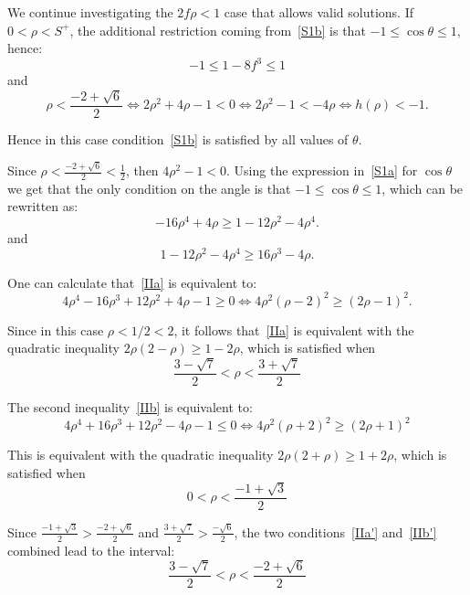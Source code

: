 \documentclass[10pt]{article}
\newcommand{\ds}{\displaystyle}
\begin{document}
\begin{description}
We continue investigating the $2 f \rho < 1$ case that allows valid solutions.
If $0<\rho<S^+$, the additional restriction coming from~\eqref{S1b} is that $-1 \leq \cos \theta \leq 1$, hence:
\[
-1 \leq 1-8f^3 \leq 1
\]
and
\[
\ds \rho < \frac{-2+\sqrt{6}}{2}
    \iff 2\rho^2+4\rho-1<0
    \iff 2\rho^2-1<-4\rho
    \iff h(\rho)<-1.
\]

Hence in this case condition~\eqref{S1b} is satisfied by all values of $\theta$.

Since $\ds \rho < \frac{-2+\sqrt{6}}{2} <\frac{1}{2}$, then $4\rho^2-1<0$. Using the expression in~\eqref{S1a} for $\cos \theta$ we get that the only condition on the angle is that $-1 \leq \cos \theta \leq 1$, which can be rewritten as:
\begin{equation}
-16\rho^4+4\rho \geq 1-12\rho^2-4\rho^4.
\tag{IIa} \label{IIa}
\end{equation}
and
\begin{equation}
1-12\rho^2-4\rho^4 \geq 16\rho^3-4\rho.
\tag{IIb} \label{IIb}
\end{equation}

One can calculate that~\eqref{IIa} is equivalent to:
\begin{equation*}
4\rho^4-16\rho^3+12\rho^2+4\rho-1 \geq 0 \iff 4\rho^2(\rho-2)^2 \geq (2\rho-1)^2.
\end{equation*}

Since in this case $\rho<1/2<2$, it follows that~\eqref{IIa} is equivalent with the quadratic inequality $2\rho(2-\rho) \geq 1-2\rho$, which is satisfied when
\begin{equation}
\frac{3-\sqrt{7}}{2} < \rho <\frac{3+\sqrt{7}}{2}
\tag{IIa$'$} \label{IIa'}
\end{equation}

The second inequality~\eqref{IIb} is equivalent to:
\begin{equation*}
4\rho^4+16\rho^3+12\rho^2-4\rho-1 \leq 0 \iff 4\rho^2(\rho+2)^2 \geq (2\rho+1)^2
\end{equation*}

This is equivalent with the quadratic inequality $2\rho(2+\rho) \geq 1+2\rho$, which is satisfied when
\begin{equation}
0 < \rho <\frac{-1+\sqrt{3}}{2}
\tag{IIb$'$} \label{IIb'}
\end{equation}

Since $\ds \frac{-1+\sqrt{3}}{2}>\frac{-2+\sqrt{6}}{2}$ and $\ds \frac{3+\sqrt{7}}{2}>\frac{-\sqrt{6}}{2}$, the two conditions~\eqref{IIa'} and~\eqref{IIb'} combined lead to the interval:
 \begin{equation}
\frac{3-\sqrt{7}}{2} < \rho <\frac{-2+\sqrt{6}}{2}
\tag{II$'$} \label{II$'$}
\end{equation}


\end{description}
\end{document}
